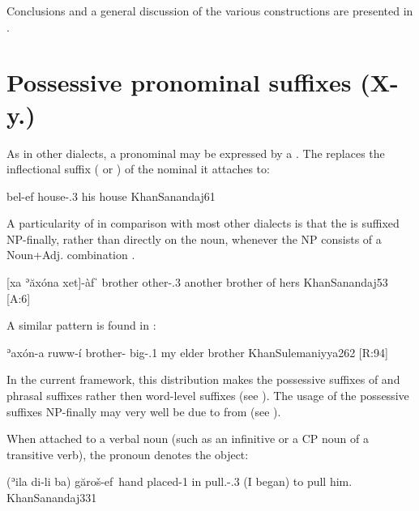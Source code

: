 Conclusions and a general discussion of the various constructions are presented in .

\section{Possessive pronominal suffixes (X-y.\poss)} \label{ss:JSan_X-y.poss}



As in other  dialects, a pronominal \secn may be expressed by a . The  replaces the inflectional suffix ( or ) of the nominal \prim it attaches to:

{bel-ef}
{house-\poss.3\masc}
{his house}
{KhanSanandaj}{61}

A particularity of \JSan in comparison with most other  dialects is that the  is suffixed NP-finally, rather than directly on the \prim noun, whenever the NP consists of a Noun+Adj. combination \citep[251]{KhanSanandaj}.
 
 {[xa ʾăxóna xet]-àfˈ}
 {\indef{} brother other-\poss.3\fem}
 {another brother of hers}
 {KhanSanandaj}{53 {[A:6]}}
 
 A similar pattern is found in \JSul:
 
 {ʾaxón-a ruww-í}
 {brother-\free{} big-\poss.1\sg}
 {my elder brother}
 {KhanSulemaniyya}{262 {[R:94]}}
 
 
 In the current framework, this distribution makes the possessive suffixes of \JSan and \JSul phrasal suffixes rather then word-level suffixes (see ). The usage of the possessive suffixes NP-finally may very well be due to  from \Sor (see ).

When attached to a verbal noun (such as an infinitive or a CP noun of a transitive verb), the pronoun denotes the object: 

{(ʾila di-li ba\cb{}) găroš-ef\,\footnotemark}
{hand placed-1\sg{} in\cb{} pull.\inf-\poss.3\masc}
{(I began) to pull him.}
{KhanSanandaj}{331}


